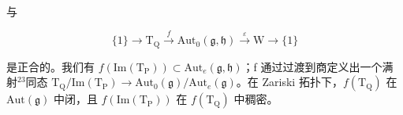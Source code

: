 与

\[
\{1 \} \longrightarrow \mathrm{T} _ {\mathrm{Q}} \stackrel {f} {\longrightarrow} \mathrm{Aut} _ {0} (\mathfrak {g}, \mathfrak {h}) \stackrel {\varepsilon} {\longrightarrow} \mathrm{W} \longrightarrow \{1 \}
\]

是正合的。我们有 \(f(\mathrm{Im}(\mathrm{T}_{\mathrm{P}})) \subset \mathrm{Aut}_{e}(\mathfrak{g}, \mathfrak{h})\)；f 通过过渡到商定义出一个满射\(^{23}\)同态 \(\mathrm{T}_{\mathrm{Q}}/\mathrm{Im}(\mathrm{T}_{\mathrm{P}}) \to \mathrm{Aut}_{0}(\mathfrak{g})/\mathrm{Aut}_{e}(\mathfrak{g})\)。在 Zariski 拓扑下，\(f(\mathrm{T}_{\mathrm{Q}})\) 在 \(\mathrm{Aut}(\mathfrak{g})\) 中闭，且 \(f(\mathrm{Im}(\mathrm{T}_{\mathrm{P}}))\) 在 \(f(\mathrm{T}_{\mathrm{Q}})\) 中稠密。


